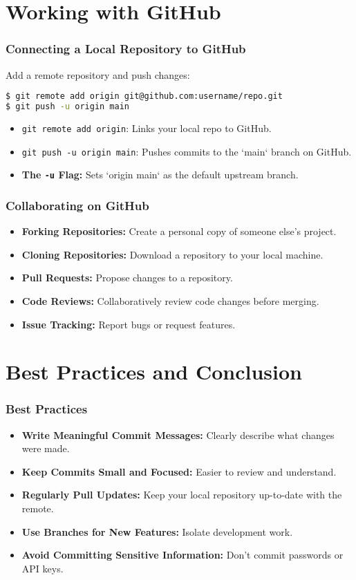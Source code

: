 \section{Working with GitHub}

\begin{frame}[fragile]
  \frametitle{Connecting a Local Repository to GitHub}
  Add a remote repository and push changes:
  \begin{lstlisting}[language=bash]
$ git remote add origin git@github.com:username/repo.git
$ git push -u origin main
  \end{lstlisting}
  \begin{itemize}
    \item \texttt{git remote add origin}: Links your local repo to GitHub.
    \item \texttt{git push -u origin main}: Pushes commits to the `main` branch on GitHub.
    \item \textbf{The \texttt{-u} Flag:} Sets `origin main` as the default upstream branch.
  \end{itemize}
\end{frame}

\begin{frame}
  \frametitle{Collaborating on GitHub}
  \begin{itemize}
    \item \textbf{Forking Repositories:} Create a personal copy of someone else's project.
    \item \textbf{Cloning Repositories:} Download a repository to your local machine.
    \item \textbf{Pull Requests:} Propose changes to a repository.
    \item \textbf{Code Reviews:} Collaboratively review code changes before merging.
    \item \textbf{Issue Tracking:} Report bugs or request features.
  \end{itemize}
\end{frame}

\section{Best Practices and Conclusion}

\begin{frame}
  \frametitle{Best Practices}
  \begin{itemize}
    \item \textbf{Write Meaningful Commit Messages:} Clearly describe what changes were made.
    \item \textbf{Keep Commits Small and Focused:} Easier to review and understand.
    \item \textbf{Regularly Pull Updates:} Keep your local repository up-to-date with the remote.
    \item \textbf{Use Branches for New Features:} Isolate development work.
    \item \textbf{Avoid Committing Sensitive Information:} Don't commit passwords or API keys.
  \end{itemize}
\end{frame}


